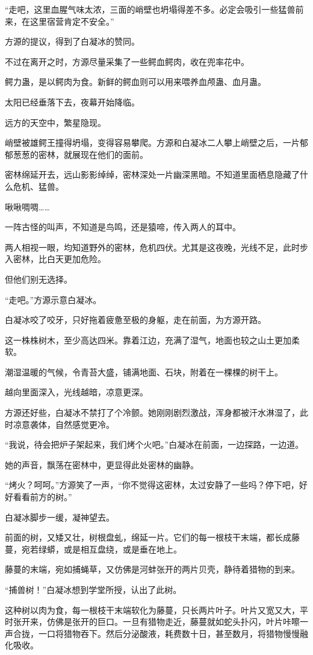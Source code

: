 \begin{this_body}
“走吧，这里血腥气味太浓，三面的峭壁也坍塌得差不多。必定会吸引一些猛兽前来，在这里宿营肯定不安全。”

方源的提议，得到了白凝冰的赞同。

不过在离开之时，方源尽量采集了一些鳄血鳄肉，收在兜率花中。

鳄力蛊，是以鳄肉为食。新鲜的鳄血则可以用来喂养血颅蛊、血月蛊。

太阳已经垂落下去，夜幕开始降临。

远方的天空中，繁星隐现。

峭壁被雄鳄王撞得坍塌，变得容易攀爬。方源和白凝冰二人攀上峭壁之后，一片郁郁葱葱的密林，就展现在他们的面前。

密林绵延开去，远山影影绰绰，密林深处一片幽深黑暗。不知道里面栖息隐藏了什么危机、猛兽。

啾啾啁啁……

一阵古怪的叫声，不知道是鸟鸣，还是猿啼，传入两人的耳中。

两人相视一眼，均知道野外的密林，危机四伏。尤其是这夜晚，光线不足，此时步入密林，比白天更加危险。

但他们别无选择。

“走吧。”方源示意白凝冰。

白凝冰咬了咬牙，只好拖着疲惫至极的身躯，走在前面，为方源开路。

这一株株树木，至少高达四米。靠着江边，充满了湿气，地面也较之山土更加柔软。

潮湿温暖的气候，令青苔大盛，铺满地面、石块，附着在一棵棵的树干上。

越向里面深入，光线越暗，凉意更深。

方源还好些，白凝冰不禁打了个冷颤。她刚刚剧烈激战，浑身都被汗水淋湿了，此时凉意袭体，自然感觉更冷。

“我说，待会把炉子架起来，我们烤个火吧。”白凝冰在前面，一边探路，一边道。

她的声音，飘荡在密林中，更显得此处密林的幽静。

“烤火？呵呵。”方源笑了一声，“你不觉得这密林，太过安静了一些吗？停下吧，好好看看前方的树。”

白凝冰脚步一缓，凝神望去。

前面的树，又矮又壮，树根盘虬，绵延一片。它们的每一根枝干末端，都长成藤蔓，宛若绿蟒，或是相互盘绕，或是垂在地上。

藤蔓的末端，宛如捕蝇草，又仿佛是河蚌张开的两片贝壳，静待着猎物的到来。

“捕兽树！”白凝冰想到学堂所授，认出了此树。

这种树以肉为食，每一根枝干末端软化为藤蔓，只长两片叶子。叶片又宽又大，平时张开来，仿佛是张开的巨口。一旦有猎物走近，藤蔓就如蛇头扑闪，叶片咔嚓一声合拢，一口将猎物吞下。然后分泌酸液，耗费数十日，甚至数月，将猎物慢慢融化吸收。


\end{this_body}
